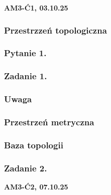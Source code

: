 \documentclass[10pt,a4paper]{article}
\newcommand{\zagadnienie}[3]{%
    \clearpage %
    \noindent\textbf{#1} #2\\
    #3
}
\begin{document}
\zagadnienie{AM3-Ć1, 03.10.25}{}
{
    \begin{tcolorbox}[mybox]
    \subsubsection*{Przestrzzeń topologiczna}
    \subsubsection*{Pytanie 1.}
    \end{tcolorbox}
    \subsubsection*{Zadanie 1.}
    \begin{tcolorbox}[mybox]
    \subsubsection*{Uwaga}
    \subsubsection*{Przestrzeń metryczna}
    \subsubsection*{Baza topologii}
    \end{tcolorbox}
    \subsubsection*{Zadanie 2.}
}
\zagadnienie{AM3-Ć2, 07.10.25}{}
\end{document}
